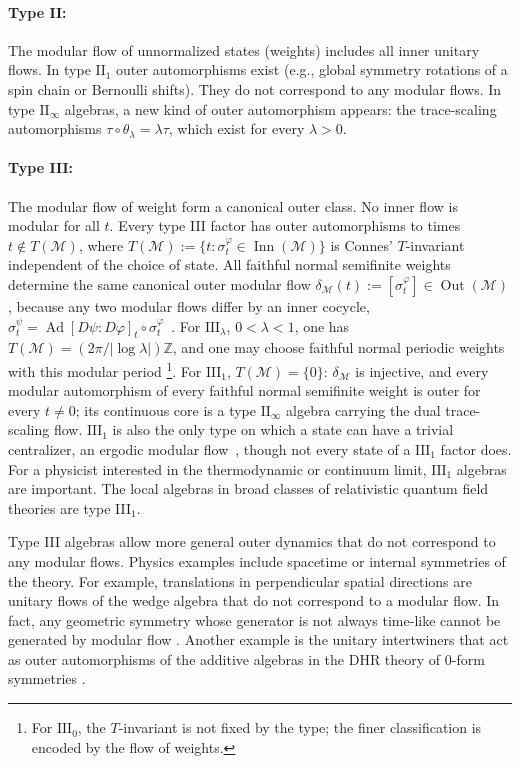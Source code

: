 \documentclass[a4paper,11pt]{article}
\theoremstyle{definition}
\newcommand{\mM}{\mathcal{M}}
\begin{document}
\paragraph{Type II:} The modular flow of unnormalized states (weights) includes all inner unitary flows. 
In type $\mathrm{II}_1$ outer automorphisms exist (e.g., global symmetry rotations of a spin chain or Bernoulli shifts). They do not correspond to any modular flows.
In type $\mathrm{II}_\infty$ algebras, a new kind of outer automorphism appears: the trace-scaling automorphisms $\tau\circ\theta_\lambda=\lambda\tau$, which exist for every $\lambda>0$.

\paragraph{Type III:} The modular flow of weight form a canonical outer class.
No inner flow is modular for all $t$. Every type III factor has outer automorphisms to times $t\notin T(\mM)$, where $T(\mM):=\{t:\sigma^\varphi_t\in\operatorname{Inn}(\mM)\}$ is Connes' $T$-invariant independent of the choice of state. All faithful normal semifinite weights determine the same canonical outer modular flow $\delta_{\mM}(t):=[\sigma^\varphi_t]\in\operatorname{Out}(\mM)$, because any two modular flows differ by an inner cocycle, $\sigma^\psi_t=\operatorname{Ad}[D\psi:D\varphi]_t\circ\sigma^\varphi_t$~\cite{Connes1973,ConnesTakesaki1977}. For $\mathrm{III}_\lambda$, $0<\lambda<1$, one has $T(\mM)=(2\pi/|\log\lambda|)\mathbb Z$, and one may choose faithful normal periodic weights with this modular period \footnote{For $\mathrm{III}_0$, the $T$-invariant is not fixed by the type; the finer classification is encoded by the flow of weights.}. For $\mathrm{III}_1$, $T(\mM)=\{0\}$: $\delta_{\mM}$ is injective, and every modular automorphism of every faithful normal semifinite weight is outer for every $t\ne0$; its continuous core is a type $\mathrm{II}_\infty$ algebra carrying the dual trace-scaling flow. $\mathrm{III}_1$ is also the only type on which a state can have a trivial centralizer, an ergodic modular flow~\cite{Connes1973,Longo1982}, though not every state of a $\mathrm{III}_1$ factor does. For a physicist interested in the thermodynamic or continuum limit, $\mathrm{III}_1$ algebras are important. The local algebras in broad classes of relativistic quantum field theories are type III$_1$. 
    
    Type III algebras allow more general outer dynamics that do not correspond to any modular flows. Physics examples include spacetime or internal symmetries of the theory. For example, translations in perpendicular spatial directions are unitary flows of the wedge algebra that do not correspond to a modular flow. In fact, any geometric symmetry whose generator is not always time-like cannot be generated by modular flow \cite{}. Another example is the unitary intertwiners that act as outer automorphisms of the additive algebras in the DHR theory of $0$-form symmetries \cite{casini2020entanglement}. 
\end{document}
